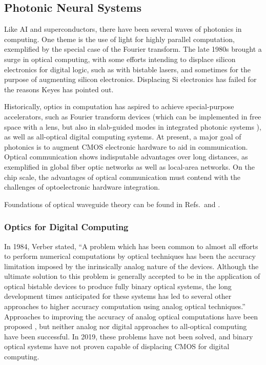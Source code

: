 \subsection{\label{sec:photonic_neural_systems}Photonic Neural Systems}
Like AI and superconductors, there have been several waves of photonics in computing. One theme is the use of light for highly parallel computation, exemplified by the special case of the Fourier transform. The late 1980s brought a surge in optical computing, with some efforts intending to displace silicon electronics for digital logic, such as with bistable lasers, and sometimes for the purpose of augmenting silicon electronics. Displacing Si electronics has failed for the reasons Keyes has pointed out.

\vspace{3em}
Historically, optics in computation has aspired to achieve special-purpose accelerators, such as Fourier transform devices (which can be implemented in free space with a lens, but also in slab-guided modes in integrated photonic systems \cite{shha1968,anbo1977}), as well as all-optical digital computing systems. At present, a major goal of photonics is to augment CMOS electronic hardware to aid in communication. Optical communication shows indisputable advantages over long distances, as exemplified in global fiber optic networks as well as local-area networks. On the chip scale, the advantages of optical communication must contend with the challenges of optoelectronic hardware integration. 

\vspace{3em}
Foundations of optical waveguide theory can be found in Refs.\,\cite{snlo1983} and \cite{hu2009}.

\subsubsection{Optics for Digital Computing}
\cite{ve1984} In 1984, Verber stated, ``A problem which has been common to almost all efforts to perform numerical computations by optical techniques has been the accuracy limitation imposed by the inrinsically analog nature of the devices. Although the ultimate solution to this problem is generally accepted to be in the application of optical bistable devices to produce fully binary optical systems, the long development times anticipated for these systems has led to several other approaches to higher accuracy computation using analog optical techniques.'' Approaches to improving the accuracy of analog optical computations have been proposed \cite{psca1980,arha1984}, but neither analog nor digital approaches to all-optical computing have been successful. In 2019, these problems have not been solved, and binary optical systems have not proven capable of displacing CMOS for digital computing. 

